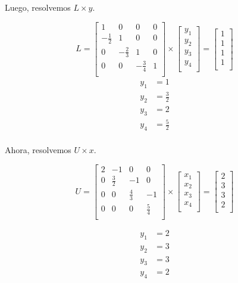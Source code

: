 \begin{itemize}
    Luego, resolvemos $L \times y$.
    
    \[
        L = \begin{bmatrix}
            1 & 0 & 0 & 0 \\
            -\frac{1}{2} & 1 & 0 & 0 \\
            0 & -\frac{2}{3} & 1 & 0 \\
            0 & 0 & -\frac{3}{4} & 1 \\
        \end{bmatrix}
        \times
        \begin{bmatrix}
            y_1 \\
            y_2 \\
            y_3 \\
            y_4 \\
        \end{bmatrix}
        =
        \begin{bmatrix}
            1 \\
            1 \\
            1 \\
            1 \\
        \end{bmatrix}
    \]
    \begin{align*}
        y_1 &= 1 \\
        y_2 &= \frac{3}{2} \\
        y_3 &= 2 \\
        y_4 &= \frac{5}{2} \\
    \end{align*}
    
    Ahora, resolvemos $U \times x$.
    
    \[
        U = \begin{bmatrix}
            2 & -1 & 0 & 0 \\
            0 & \frac{3}{2} & -1 & 0 \\
            0 & 0 & \frac{4}{3} & -1 \\
            0 & 0 & 0 & \frac{5}{4} \\
        \end{bmatrix}
        \times
        \begin{bmatrix}
            x_1 \\
            x_2 \\
            x_3 \\
            x_4 \\
        \end{bmatrix}
        =
        \begin{bmatrix}
            2 \\
            3 \\
            3 \\
            2 \\
        \end{bmatrix}
    \]

    \begin{align*}
        y_1 &= 2 \\
        y_2 &= 3 \\
        y_3 &= 3 \\
        y_4 &= 2 \\
    \end{align*}

\end{itemize}